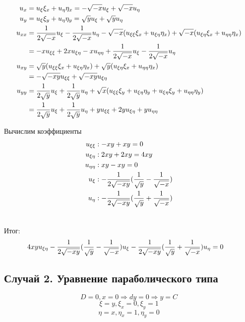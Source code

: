 \documentclass[12pt]{article}
\begin{document}
\begin{align}
u_x &= u_\xi\xi_x + u_\eta\eta_x = -\sqrt{-x}u_\xi + \sqrt{-x}u_\eta \notag \\ \notag
u_y &= u_\xi\xi_y + u_\eta\eta_y = \sqrt{y}u_\xi + \sqrt{y}u_\eta \\ \notag
u_{xx} &= \frac{1}{2\sqrt{-x}}u_\xi - \frac{1}{2\sqrt{-x}}u_\eta 
- \sqrt{-x}(u_{\xi\xi}\xi_x + u_{\xi\eta}\eta_x)
+ \sqrt{-x}(u_{\xi\eta}\xi_x + u_{\eta\eta}\eta_x) \\ \notag
&= -xu_{\xi\xi} + 2xu_{\xi\eta} - xu_{\eta\eta} + \frac{1}{2\sqrt{-x}}u_\xi - \frac{1}{2\sqrt{-x}}u_\eta \\ \notag
u_{xy} &= \sqrt{y}(u_{\xi\xi}\xi_x + u_{\xi\eta}\eta_x) + \sqrt{y}(u_{\xi\eta}\xi_x + u_{\eta\eta}\eta_x)  \\ \notag
&= -\sqrt{-xy}u_{\xi\xi} + \sqrt{-xy}u_{\xi\eta} \\ \notag
u_{yy} &= \frac{1}{2\sqrt{y}}u_\xi + \frac{1}{2\sqrt{y}}u_\eta + \sqrt{x}(u_{\xi\xi}\xi_y + u_{\xi\eta}\eta_y + u_{\xi\eta}\xi_y + u_{\eta\eta}\eta_y) \\ \notag
&= \frac{1}{2\sqrt{y}}u_\xi + \frac{1}{2\sqrt{y}}u_\eta + yu_{\xi\xi} + 2yu_{\xi\eta} + yu_{\eta\eta} \notag
\end{align}

Вычислим коэффициенты
\begin{align}
u_{\xi\xi} &: -xy + xy = 0 \notag \\ \notag
u_{\xi\eta} &: 2xy + 2xy = 4xy \\ \notag
u_{\eta\eta} &: xy - xy = 0 \\ \notag
u_\xi &: -\frac{1}{2\sqrt{-xy}}(\frac{1}{\sqrt{y}} - \frac{1}{\sqrt{-x}}) \\ \notag
u_\eta &: -\frac{1}{2\sqrt{-xy}}(\frac{1}{\sqrt{y}} + \frac{1}{\sqrt{-x}}) \\ \notag
\end{align}

Итог:
\begin{align}
4xyu_{\xi\eta} \notag
- \frac{1}{2\sqrt{-xy}}(\frac{1}{\sqrt{y}} - \frac{1}{\sqrt{-x}})u_\xi \notag 
&- \frac{1}{2\sqrt{-xy}}(\frac{1}{\sqrt{y}} + \frac{1}{\sqrt{-x}})u_\eta = 0 \notag
\end{align}

\subsection{Случай 2. Уравнение параболического типа}
$$D = 0, x = 0 \Rightarrow dy = 0 \Rightarrow y = C$$
$$\xi = y, \xi_x = 0, \xi_y = 1$$
$$\eta = x, \eta_x = 1, \eta_y = 0$$
\end{document}
